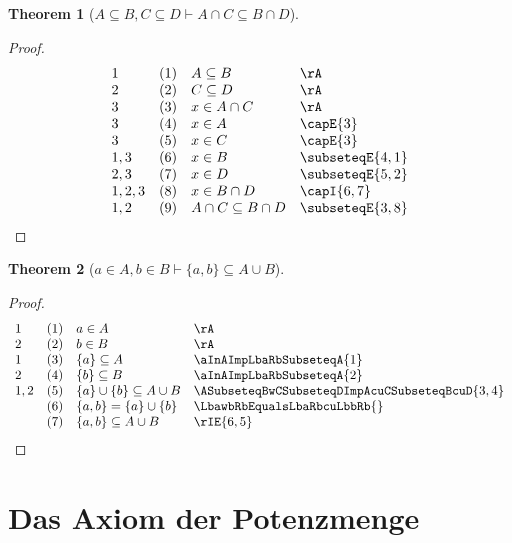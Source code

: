 \documentclass{book}
\theoremstyle{plain}
\newtheorem{theorem}{Theorem}
\theoremstyle{remark}
\theoremstyle{definition}
\begin{document}
\label{ASubseteqBwCSubseteqDImpAcaCSubseteqBcaD}
\begin{theorem}[\(A \subseteq B, C \subseteq D \vdash A \cap C \subseteq B \cap D\)]
\end{theorem}
\begin{proof}
	\[
	\begin{array}{llll}
		1 & (1) & A \subseteq B & \rA \\
		2 & (2) & C \subseteq D & \rA \\
		3 & (3) & x \in A \cap C & \rA \\
		3 & (4) & x \in A & \capE{3}\\
		3 & (5) & x \in C & \capE{3}\\
		1,3 & (6) & x \in B & \subseteqE{4,1}\\
		2,3 & (7) & x \in D & \subseteqE{5,2}\\
		1,2,3 & (8) & x\in B\cap D & \capI{6,7}\\	
		1,2 & (9) & A\cap C\subseteq B\cap D & \subseteqE{3,8}\\
	\end{array}
	\]
\end{proof}

\label{aInAwbInBImpLbawbRbSubseteqAcuB}
\begin{theorem}[\(a\in A, b\in B\vdash \{a,b\}\subseteq A\cup B\)]
\end{theorem}	
\begin{proof}
	\[
	\begin{array}{llll}
		1 & (1) & a\in A & \rA \\
		2 & (2) & b\in B & \rA \\
		1 & (3) & \{a\}\subseteq A & \aInAImpLbaRbSubseteqA{1} \\
		2 & (4) & \{b\}\subseteq B & \aInAImpLbaRbSubseteqA{2} \\
		1,2 & (5) & \{a\}\cup \{b\}\subseteq A\cup B & \ASubseteqBwCSubseteqDImpAcuCSubseteqBcuD{3,4} \\
		& (6) & \{a,b\} = \{a\}\cup \{b\}  & \LbawbRbEqualsLbaRbcuLbbRb{} \\
		& (7) & \{a,b\}\subseteq A\cup B & \rIE{6,5} \\
	\end{array}
	\]
\end{proof}


\section{Das Axiom der Potenzmenge}
\end{document}
